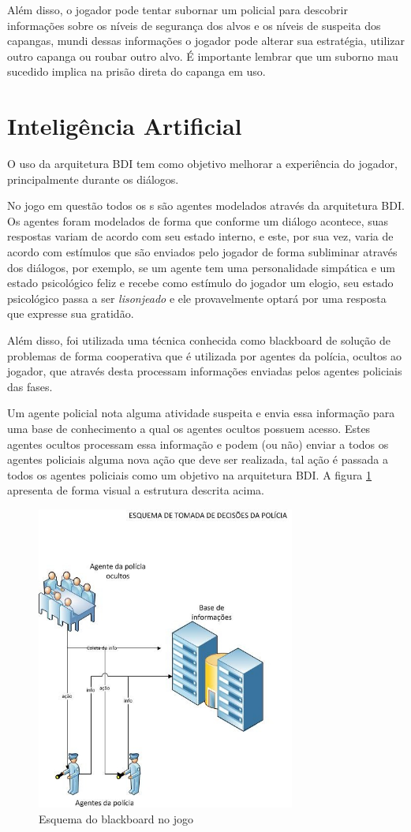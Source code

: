 Além disso, o jogador pode tentar subornar um policial para descobrir informações sobre os níveis de segurança dos alvos e os níveis de suspeita dos capangas, mundi dessas informações o jogador pode alterar sua estratégia, utilizar outro capanga ou roubar outro alvo. É importante lembrar que um suborno mau sucedido implica na prisão direta do capanga em uso.

\section{Inteligência Artificial}
O uso da arquitetura BDI tem como objetivo melhorar a experiência do jogador, principalmente durante os diálogos.

No jogo em questão todos os \npc{}s são agentes modelados através da arquitetura BDI. Os agentes foram modelados de forma que conforme um diálogo acontece, suas respostas variam de acordo com seu estado interno, e este, por sua vez, varia de acordo com estímulos que são enviados pelo jogador de forma subliminar através dos diálogos, por exemplo, se um agente tem uma personalidade simpática e um estado psicológico feliz e recebe como estímulo do jogador um elogio, seu estado psicológico passa a ser \emph{lisonjeado} e ele provavelmente optará por uma resposta que expresse sua gratidão.

Além disso, foi utilizada uma técnica conhecida como blackboard de solução de problemas de forma cooperativa que é utilizada por agentes da polícia, ocultos ao jogador, que através desta processam informações enviadas pelos agentes policiais das fases.

Um agente policial nota alguma atividade suspeita e envia essa informação para uma base de conhecimento a qual os agentes ocultos possuem acesso. Estes agentes ocultos processam essa informação e podem (ou não) enviar a todos os agentes policiais alguma nova ação que deve ser realizada, tal ação é passada a todos os agentes policiais como um objetivo na arquitetura BDI.
A figura \ref{blackboard_policia} apresenta de forma visual a estrutura descrita acima.
\begin{figure}
\centering
\includegraphics [height=10cm]{figuras/blackboard_policia.jpg}
\caption{Esquema do blackboard no jogo}
\label{blackboard_policia}
\end{figure}

